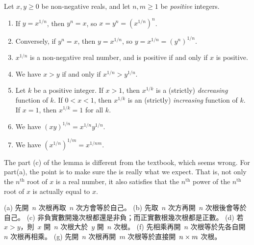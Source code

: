 \begin{lemma} \label{lem 5.6.6}
Let \(x, y \ge 0\) be non-negative reals, and let \(n, m \ge 1\) be \emph{positive} integers.
\begin{enumerate}
    \item If \(y = x^{1 / n}\), then \(y^n = x\), so \(x = y^n = (x^{1/n})^n\).
    \item Conversely, if \(y^n = x\), then \(y = x^{1 / n}\), so \(y = x^{1/n} = (y^n)^{1/n}\).
    \item \(x^{1 / n}\) is a non-negative real number, and is positive if and only if \(x\) is positive.
    \item We have \(x > y\) if and only if \(x^{1 / n} > y^{1 / n}\).
    \item Let \(k\) be a positive integer.
        If \(x > 1\), then \(x^{1 / k}\) is a (strictly) \emph{decreasing} function of \(k\).
        If \(0 < x < 1\), then \(x^{1 / k}\) is an (strictly) \emph{increasing} function of \(k\).
        If \(x = 1\), then \(x^{1 / k} = 1\) for all \(k\).
    \item We have \((xy)^{1 / n} = x^{1 / n}y^{1 / n}\).
    \item We have \((x^{1 / n})^{1 / m} = x^{1 / nm}\).
\end{enumerate}
\end{lemma}

\begin{note}
The part (c) of the lemma is different from the textbook, which seems wrong.
For part(a), the point is to make sure the  is really what we expect.
That is, not only the \(n^{\text{th}}\) root of \(x\) is a real number, it also satisfies that the \(n^{\text{th}}\) power of the \(n^{\text{th}}\) root of \(x\) is actually equal to \(x\).
\end{note}

\begin{note}
(a) 先開\ \(n\) 次根再取\ \(n\) 次方會等於自己。
(b) 先取\ \(n\) 次方再開\ \(n\) 次根後會等於自己。
(c) 非負實數開幾次根都還是非負；而正實數根幾次根都是正數。
(d) 若\ \(x > y\)，則\ \(x\) 開\ \(n\) 次根大於\ \(y\) 開\ \(n\) 次根。
(f) 先相乘再開\ \(n\) 次根等於先各自開\ \(n\) 次根再相乘。
(g) 先開\ \(n\) 次根再開\ \(m\) 次根等於直接開\ \(n \times m\) 次根。
\end{note}

